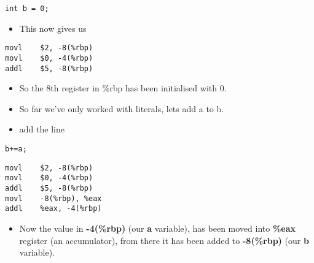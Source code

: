 \documentclass[minimal, t]{article}
\begin{document}
\begin{verbatim}
int b = 0;
\end{verbatim}
\begin{itemize}
\item This now gives us
\end{itemize}

\begin{verbatim}
movl    $2, -8(%rbp)
movl    $0, -4(%rbp)
addl    $5, -8(%rbp)
\end{verbatim}
\begin{itemize}
\item So the 8th register in \%rbp has been initialised with 0.

\item So far we've only worked with literals, lets add a to b.
\item add the line
\end{itemize}
\begin{verbatim}
b+=a;
\end{verbatim}

\begin{verbatim}
movl    $2, -8(%rbp)
movl    $0, -4(%rbp)
addl    $5, -8(%rbp)
movl    -8(%rbp), %eax
addl    %eax, -4(%rbp)
\end{verbatim}
\begin{itemize}
\item Now the value in \textbf{-4(\%rbp)} (our \textbf{a} variable), has been moved into
\textbf{\%eax} register (an accumulator), from there it has been added to \textbf{-8(\%rbp)}
(our \textbf{b} variable).
\end{itemize}
\end{document}
